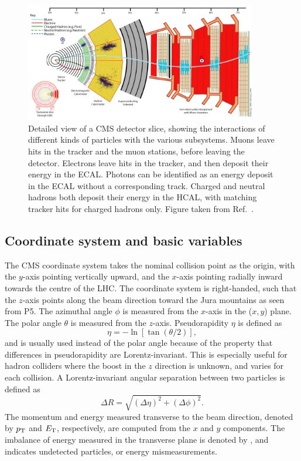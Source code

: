 \begin{figure}[htpb]
  \centering
  \includegraphics[width=0.9\textwidth]{figures/cms/CMS_Slice}
  \caption{Detailed view of a CMS detector slice, showing the interactions of different kinds of
particles with the various subsystems. Muons leave hits in the tracker and the muon stations,
before leaving the detector. Electrons leave hits in the tracker, and then deposit their
energy in the ECAL. Photons can be identified as an energy deposit in the ECAL without a
corresponding track. Charged and neutral hadrons both deposit their energy in the HCAL, with
matching tracker hits for charged hadrons only. 
Figure taken from Ref.~\cite{CMS_slice}.
  \label{fig:cms_slice}}
\end{figure}

\subsection{Coordinate system and basic variables \label{sec:cms_coordinates}}

The CMS coordinate system takes the nominal collision point as the origin, with the $y$-axis
pointing vertically upward, and the $x$-axis pointing radially inward towards the centre of the
LHC. The coordinate system is right-handed, such that the $z$-axis points along the beam direction
toward the Jura mountains as seen from P5. 
The azimuthal angle $\phi$ is measured from the $x$-axis in the ($x,y$) plane. The polar angle
$\theta$ is measured from the $z$-axis. 
Pseudorapidity $\eta$ is defined as 
\begin{equation}
 \eta = - \ln \left[ \tan(\theta/2) \right],  
\end{equation}
and is usually used instead of the
polar angle because of the property that differences in pseudorapidity are
Lorentz-invariant. This is especially useful for hadron colliders where the boost in the $z$
direction is unknown, and varies for each collision. A Lorentz-invariant angular separation between
two particles is defined as 
\begin{equation}
\Delta R = \sqrt{(\Delta\eta)^2 + (\Delta\phi)^2}.
\end{equation}
The momentum and energy measured transverse to the beam direction, denoted by $p_{\mathrm{T}}$ and $E_{\mathrm{T}}$,
respectively, are computed from the $x$ and $y$ components.
The imbalance of energy measured in the transverse plane is denoted by \ETm, and indicates
undetected particles, or energy mismeasurements.
 


